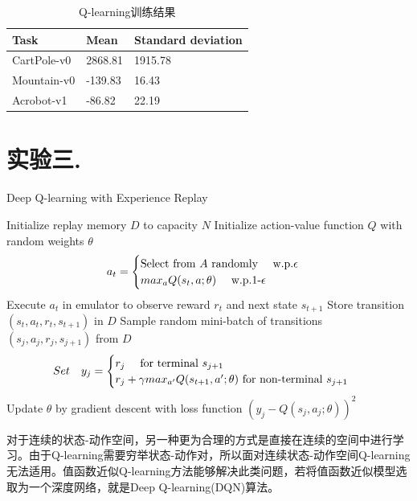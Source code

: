 \documentclass[a4paper,UTF8]{article}
\theoremstyle{definition}
\renewcommand{\algorithmicrequire}{\textbf{Input:}}
\renewcommand{\algorithmicensure}{\textbf{Procedure:}}
\begin{document}
\begin{table}[!h]
\caption{Q-learning训练结果}  
\centering
\begin{tabular*}{8cm}{lll}  
\hline  
Task & Mean 
 &  Standard deviation\\  
\hline  
CartPole-v0  & 2868.81 & 1915.78 \\  
Mountain-v0  & -139.83 & 16.43 \\ 
Acrobot-v1 	 & -86.82  & 22.19 \\ 
\hline  
\end{tabular*}  
\end{table} 

\section*{实验三. }
	\begin{algorithm}[!h]
	\renewcommand{\algorithmicrequire}{\textbf{Input:}}
	\renewcommand{\algorithmicensure}{\textbf{Output:}}
	\caption{Deep Q-learning with Experience Replay}
	\label{alg:2}
	\begin{algorithmic}[1]
		\STATE Initialize replay memory $D$ to capacity $N$
		\STATE Initialize action-value function $Q$ with random weights $\theta$
			\STATE	$$a_t=
\begin{cases}
\text{Select from $A$ randomly \quad w.p.$\epsilon$}\\
\text{$max_a$$Q(s_t,a;\theta)$ \quad w.p.1-$\epsilon$ }
\end{cases}$$
\STATE Execute $a_t$ in emulator to observe reward $r_t$ and next state $s_{t+1}$
\STATE Store transition $(s_t,a_t,r_t,s_{t+1})$ in $D$
\STATE Sample random mini-batch of transitions $(s_j,a_j,r_j,s_{j+1})$ from $D$
\STATE	$$Set \quad y_j=
\begin{cases}
\text{$r_j$ \quad for terminal $s_{j+1}$}\\
\text{$r_j+\gamma max_{a'}Q(s_{t+1},a';\theta)$ for non-terminal $s_{j+1}$ }
\end{cases}$$
\STATE Update $\theta$ by gradient descent with loss function $(y_j-Q(s_j,a_j;\theta))^2$
			\ENDFOR
		\ENDFOR
\end{algorithmic}  
\end{algorithm}
	对于连续的状态-动作空间，另一种更为合理的方式是直接在连续的空间中进行学习。由于Q-learning需要穷举状态-动作对，所以面对连续状态-动作空间Q-learning无法适用。值函数近似Q-learning方法能够解决此类问题，若将值函数近似模型选取为一个深度网络，就是Deep Q-learning(DQN)算法。
\end{document}
